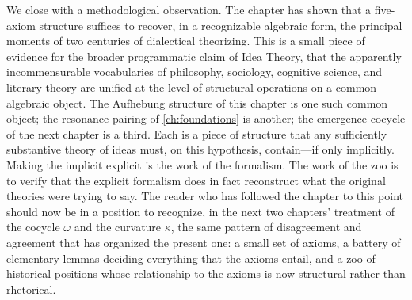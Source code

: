 We close with a methodological observation. The chapter has shown
that a five-axiom structure suffices to recover, in a recognizable
algebraic form, the principal moments of two centuries of
dialectical theorizing. This is a small piece of evidence for the
broader programmatic claim of Idea Theory, that the apparently
incommensurable vocabularies of philosophy, sociology, cognitive
science, and literary theory are unified at the level of structural
operations on a common algebraic object. The Aufhebung structure of
this chapter is one such common object; the resonance pairing of
\cref{ch:foundations} is another; the emergence cocycle of the next
chapter is a third. Each is a piece of structure that any sufficiently
substantive theory of ideas must, on this hypothesis, contain---if
only implicitly. Making the implicit explicit is the work of the
formalism. The work of the zoo is to verify that the explicit
formalism does in fact reconstruct what the original theories were
trying to say. The reader who has followed the chapter to this point
should now be in a position to recognize, in the next two chapters'
treatment of the cocycle $\omega$ and the curvature $\kappa$, the
same pattern of disagreement and agreement that has organized the
present one: a small set of axioms, a battery of elementary lemmas
deciding everything that the axioms entail, and a zoo of historical
positions whose relationship to the axioms is now structural rather
than rhetorical.

